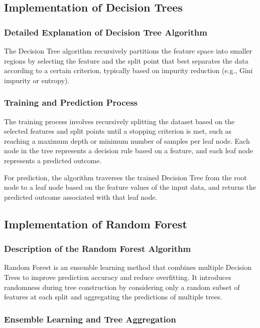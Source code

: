 \documentclass{ufazreport}
\begin{document}
\subsection{Implementation of Decision Trees}

\subsubsection{Detailed Explanation of Decision Tree Algorithm}

The Decision Tree algorithm recursively partitions the feature space into smaller regions by selecting the feature and the split point that best separates the data according to a certain criterion, typically based on impurity reduction (e.g., Gini impurity or entropy).

\subsubsection{Training and Prediction Process}

The training process involves recursively splitting the dataset based on the selected features and split points until a stopping criterion is met, such as reaching a maximum depth or minimum number of samples per leaf node. Each node in the tree represents a decision rule based on a feature, and each leaf node represents a predicted outcome.

For prediction, the algorithm traverses the trained Decision Tree from the root node to a leaf node based on the feature values of the input data, and returns the predicted outcome associated with that leaf node.

\subsection{Implementation of Random Forest}

\subsubsection{Description of the Random Forest Algorithm}

Random Forest is an ensemble learning method that combines multiple Decision Trees to improve prediction accuracy and reduce overfitting. It introduces randomness during tree construction by considering only a random subset of features at each split and aggregating the predictions of multiple trees.

\subsubsection{Ensemble Learning and Tree Aggregation}
\end{document}
